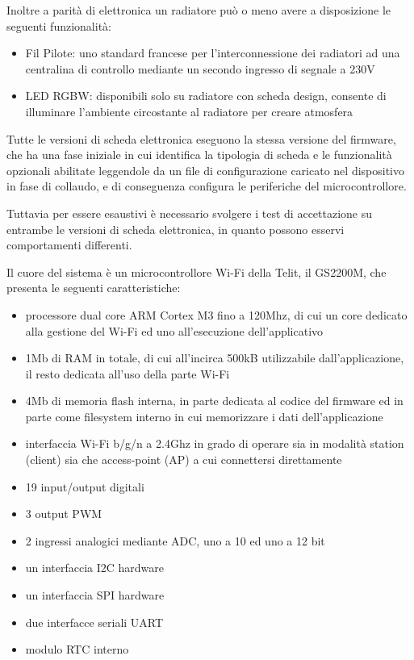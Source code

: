 \documentclass[12pt,a4paper,twoside,titlepage]{book}
\begin{document}
Inoltre a parità di elettronica un radiatore può o meno avere a disposizione le
seguenti funzionalità:
\begin{itemize}
    \item Fil Pilote: uno standard francese per l'interconnessione dei radiatori ad una
        centralina di controllo mediante un secondo ingresso di segnale a 230V
    \item LED RGBW: disponibili solo su radiatore con scheda design, consente di
        illuminare l'ambiente circostante al radiatore per creare atmosfera
\end{itemize}

Tutte le versioni di scheda elettronica eseguono la stessa versione del firmware,
che ha una fase iniziale in cui identifica la tipologia di scheda e le funzionalità
opzionali abilitate leggendole da un file di configurazione caricato nel dispositivo
in fase di collaudo, e di conseguenza configura le periferiche del microcontrollore.

Tuttavia per essere esaustivi è necessario svolgere i test di accettazione su entrambe
le versioni di scheda elettronica, in quanto possono esservi comportamenti differenti.

Il cuore del sistema è un microcontrollore Wi-Fi della Telit, il GS2200M, che presenta
le seguenti caratteristiche:

\begin{itemize}
    \item processore dual core ARM Cortex M3 fino a 120Mhz, di cui un core dedicato
        alla gestione del Wi-Fi ed uno all'esecuzione dell'applicativo
    \item 1Mb di RAM in totale, di cui all'incirca 500kB utilizzabile dall’applicazione,
        il resto dedicata all'uso della parte Wi-Fi
    \item 4Mb di memoria flash interna, in parte dedicata al codice del firmware ed
        in parte come filesystem interno in cui memorizzare i dati dell'applicazione
    \item interfaccia Wi-Fi b/g/n a 2.4Ghz in grado di operare sia in modalità station
        (client) sia che access-point (AP) a cui connettersi direttamente
    \item 19 input/output digitali
    \item 3 output PWM
    \item 2 ingressi analogici mediante ADC, uno a 10 ed uno a 12 bit
    \item un interfaccia I2C hardware
    \item un interfaccia SPI hardware
    \item due interfacce seriali UART
    \item modulo RTC interno
\end{itemize}
\end{document}
